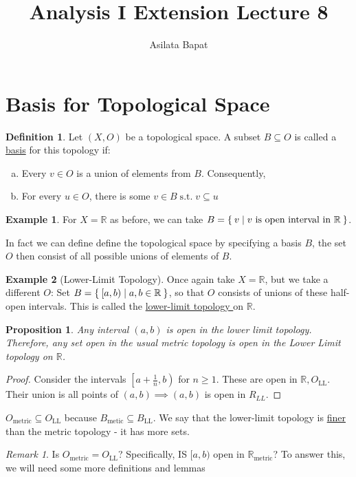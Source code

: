 \documentclass[12pt]{amsart}
\title{Analysis I Extension Lecture 8}
\author{Asilata Bapat}
\newcommand{\bbR}{\mathbb{R}}
\newcommand{\suchthat}{\operatorname{s.t.}}
\newcommand{\LL}{\operatorname{LL}}
\theoremstyle{plain}
\newtheorem*{prop}{Proposition}
\theoremstyle{remark}
\newtheorem*{rmk}{Remark}
\theoremstyle{definition}
\newtheorem*{define}{Definition}
\newtheorem*{eg}{Example}
\begin{document}
\maketitle
{}

\section*{Basis for Topological Space}
\begin{define}
	Let $(X, O)$ be a topological space. A subset $B \subseteq O$ is called a \ul{basis} for this topology if:
	\begin{enumerate}[a)]
	\item Every $v \in O$ is a union of elements from $B$. Consequently,
	\item For every $u\in O$, there is some $v \in B \suchthat v \subseteq u$  
	\end{enumerate}
\end{define}

\begin{eg}
	For $X = \bbR$ as before, we can take $B = \Set{v|v \text{ is open interval in } \bbR}$. 
\end{eg}

In fact we can define define the topological space by specifying a basis $B$, the set $O$ then consist of all possible unions of elements of $B$.

\begin{eg}[Lower-Limit Topology]
	Once again take $X = \bbR$, but we take a different $O$:
	\newline
	Set $B = \Set{[a,b)| a,b\in \bbR}$, so that $O$ consists of unions of these half-open intervals. This is called the \ul{lower-limit topology } on $\bbR$.
\end{eg}

\begin{prop}
	Any interval $(a,b)$ is open in the lower limit topology. Therefore, any set open in the usual metric topology is open in the Lower Limit topology on $\bbR$.	
\end{prop}

\begin{proof}
	Consider the intervals $\left[a + \frac{1}{n}, b\right)$ for $n \geqslant 1$. These are open in $\bbR, O_{\LL}$. Their union is all points of $(a,b) \implies (a, b)$ is open in $R_{LL}$.
	\newline
\end{proof}

$O_{\text{metric}} \subseteq O_{\LL}$ because $B_{\text{metic}} \subseteq B_{\LL}$. We say that the lower-limit topology is \ul{finer} than the metric topology - it has more sets.
	\begin{rmk}
		Is $O_{\text{metric}} = O_{\LL}$? Specifically, IS $[a, b)$ open in $\bbR_{\text{metric}}$?
		\newline
		To answer this, we will need some more definitions and lemmas 
	\end{rmk}
\end{document}

